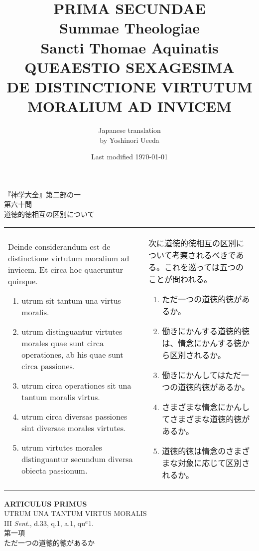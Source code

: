 \documentclass[10pt]{jsarticle}
\title{{\bf PRIMA SECUNDAE}\\{\HUGE Summae Theologiae}\\Sancti Thomae
Aquinatis\\{\sffamily QUEAESTIO SEXAGESIMA}\\DE DISTINCTIONE VIRTUTUM MORALIUM AD INVICEM}
\author{Japanese translation\\by Yoshinori {\sc Ueeda}}
\date{Last modified \today}
\begin{document}
\maketitle
\thispagestyle{empty}

\begin{center}
{\LARGE 『神学大全』第二部の一}\\
{\Large 第六十問\\道徳的徳相互の区別について}
\end{center}

\begin{longtable}{p{21em}p{21em}}

Deinde considerandum est de distinctione virtutum moralium ad
invicem. Et circa hoc quaeruntur quinque.
  
\begin{enumerate}
 \item utrum sit tantum una virtus moralis.
 \item utrum distinguantur virtutes morales quae sunt circa operationes, ab his quae sunt circa passiones.
 \item utrum circa operationes sit una tantum moralis virtus.
 \item utrum circa diversas passiones sint diversae morales virtutes.
 \item utrum virtutes morales distinguantur secundum diversa obiecta passionum.
\end{enumerate}

&

 次に道徳的徳相互の区別について考察されるべきである。これを巡っては五つのことが問われる。

\begin{enumerate}
 \item ただ一つの道徳的徳があるか。
 \item 働きにかんする道徳的徳は、情念にかんする徳から区別されるか。
 \item 働きにかんしてはただ一つの道徳的徳があるか。
 \item さまざまな情念にかんしてさまざまな道徳的徳があるか。
 \item 道徳的徳は情念のさまざまな対象に応じて区別されるか。
\end{enumerate}
\end{longtable}
\newpage

\begin{center}
{\Large {\bf ARTICULUS PRIMUS}}\\
{\large UTRUM UNA TANTUM VIRTUS MORALIS}\\
{\footnotesize III {\itshape Sent.}, d.33, q.1, a.1, qu$^{a}$1.}\\
{\Large 第一項\\ただ一つの道徳的徳があるか}
\end{center}
\end{document}
